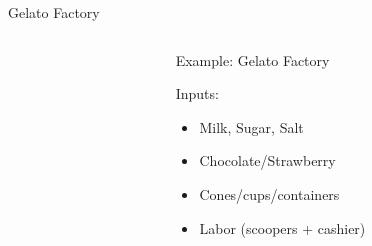 \documentclass[notes,11pt, aspectratio=169, xcolor=table]{beamer}
\newenvironment{wideitemize}{\itemize\addtolength{\itemsep}{10pt}}{\enditemize}
\begin{document}
\begin{frame}{Gelato Factory}

\begin{columns}[T] %
\begin{column}{.4\textwidth}
\end{column}%
\hfill%
\begin{column}{.6\textwidth}
  \begin{wideitemize}
    \item Example: Gelato Factory
    \item<2-> Inputs:
    \begin{itemize}
        \item Milk, Sugar, Salt
        \item Chocolate/Strawberry
        \item Cones/cups/containers
        \item Labor (scoopers + cashier)

\end{itemize}
\end{wideitemize}
\end{column}
\end{columns}
\end{frame}
\end{document}
